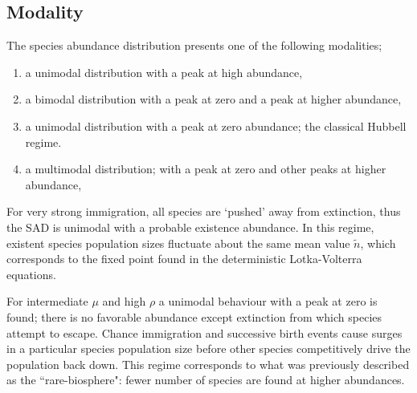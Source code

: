 \documentclass[9pt,lineno]{elife}
\begin{document}
\subsection{Modality}
The species abundance distribution presents one of the following modalities; 
\begin{enumerate}[label=(\Roman*)]
    \item a unimodal distribution with a peak at high abundance, 
    \item a bimodal distribution with a peak at zero and a peak at higher abundance,
    \item a unimodal distribution with a peak at zero abundance; the classical Hubbell regime.
    \item a multimodal distribution; with a peak at zero and other peaks at higher abundance,
\end{enumerate}
%
%
For very strong immigration, all species are `pushed' away from extinction, thus the SAD is unimodal with a probable existence abundance.
In this regime, existent species population sizes fluctuate about the same mean value $\tilde{n}$,  which corresponds to the fixed point found in the  deterministic Lotka-Volterra equations.

For intermediate $\mu$ and high $\rho$ a unimodal behaviour with a peak at zero is found; there is no favorable abundance except extinction from which species attempt to escape.
Chance immigration and successive birth events cause surges in a particular species population size before other species competitively drive the population back down.
This regime corresponds to what was previously described as the ``rare-biosphere": fewer number of species are found at higher abundances.
\end{document}
